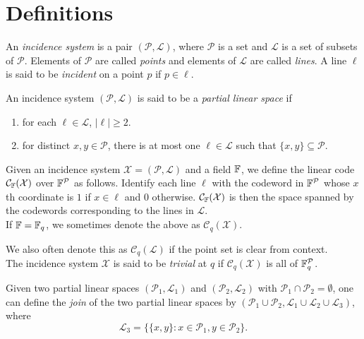 \documentclass{article}
\begin{document}
\thispagestyle{empty}
\titleBC

\tableofcontents

\section{Definitions}

	\begin{fdef}
		An \emph{incidence system} is a pair $(\mathcal{P},\mathcal{L})$, where $\mathcal{P}$ is a set and $\mathcal{L}$ is a set of subsets of $\mathcal{P}$. Elements of $\mathcal{P}$ are called \emph{points} and elements of $\mathcal{L}$ are called \emph{lines}. A line $\ell$ is said to be \emph{incident} on a point $p$ if $p \in \ell$.\\
	\end{fdef}

	\begin{fdef}
		An incidence system $(\mathcal{P},\mathcal{L})$ is said to be a \emph{partial linear space} if
		\begin{enumerate}
		 	\item for each $\ell \in \mathcal{L}$, $|\ell| \ge 2$.
		 	\item for distinct $x,y \in \mathcal{P}$, there is at most one $\ell \in \mathcal{L}$ such that $\{x,y\} \subseteq \mathcal{P}$.
		\end{enumerate}
	\end{fdef}

	\begin{fdef}
		Given an incidence system $\mathcal{X} = (\mathcal{P},\mathcal{L})$ and a field $\mathbb{F}$, we define the linear code $\mathcal{C}_{\mathbb{F}}(\mathcal{X})$ over $\mathbb{F}^\mathcal{P}$ as follows. Identify each line $\ell$ with the codeword in $\mathbb{F}^{\mathcal{P}}$ whose $x$th coordinate is $1$ if $x \in \ell$ and $0$ otherwise. $\mathcal{C}_{\mathbb{F}}(\mathcal{X})$ is then the space spanned by the codewords corresponding to the lines in $\mathcal{L}$.\\
		If $\mathbb{F} = \mathbb{F}_q$, we sometimes denote the above as $\mathcal{C}_q(\mathcal{X})$.
	\end{fdef}
	We also often denote this as $\mathcal{C}_q(\mathcal{L})$ if the point set is clear from context.\\
	The incidence system $\mathcal{X}$ is said to be \emph{trivial} at $q$ if $\mathcal{C}_q(\mathcal{X})$ is all of $\mathbb{F}_q^{\mathcal{P}}$.

	\begin{fdef}[Join]
		Given two partial linear spaces $(\mathcal{P}_1,\mathcal{L}_1)$ and $(\mathcal{P}_2,\mathcal{L}_2)$ with $\mathcal{P}_1 \cap \mathcal{P}_2 = \emptyset$, one can define the \emph{join} of the two partial linear spaces by $(\mathcal{P}_1 \cup \mathcal{P}_2, \mathcal{L}_1\cup\mathcal{L}_2\cup\mathcal{L}_3)$, where
		\[ \mathcal{L}_3 = \{ \{x,y\} : x \in \mathcal{P}_1, y \in \mathcal{P}_2 \}. \]
	\end{fdef}
\end{document}
